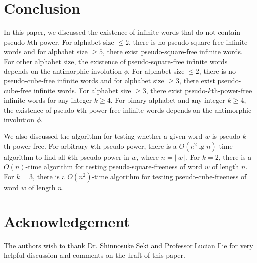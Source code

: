 \documentclass[12pt]{article}
\def\abs#1{{|\,#1\,|}}
\begin{document}
\section{Conclusion}\label{section:conclusion}
In this paper, we discussed the existence of infinite words that do
not contain pseudo-$k$th-power. For alphabet size $\leq 2$, there is
no pseudo-square-free infinite words and for alphabet size $\geq 5$,
there exist pseudo-square-free infinite words. For other alphabet
size, the existence of pseudo-square-free infinite words depends on
the antimorphic involution $\phi$. For alphabet size $\leq 2$, there
is no pseudo-cube-free infinite words and for alphabet size $\geq
3$, there exist pseudo-cube-free infinite words. For alphabet size
$\geq 3$, there exist pseudo-$k$th-power-free infinite words for any
integer $k\geq 4$. For binary alphabet and any integer $k\geq 4$,
the existence of pseudo-$k$th-power-free infinite words depends on
the antimorphic involution $\phi$.


We also discussed the algorithm for testing whether a given word $w$
is pseudo-$k$th-power-free. For arbitrary $k$th pseudo-power, there
is a $O(n^2\lg n)$-time algorithm to find all $k$th pseudo-power in
$w$, where $n=\abs{w}$. For $k=2$, there is a $O(n)$-time algorithm
for testing pseudo-square-freeness of word $w$ of length $n$. For
$k=3$, there is a $O(n^2)$-time algorithm for testing
pseudo-cube-freeness of word $w$ of length $n$.



\section*{Acknowledgement}
The authors wish to thank Dr. Shinnosuke Seki and Professor Lucian
Ilie for very helpful discussion and comments on the draft of this
paper.
\end{document}
